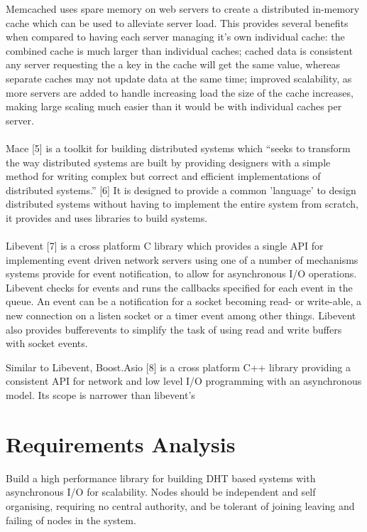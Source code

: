 \documentclass{article}
\begin{document}
Memcached uses spare memory on web servers to create a distributed in-memory cache which can be used to alleviate server load. This provides several benefits when compared to having each server managing it's own individual cache: the combined cache is much larger than individual caches; cached data is consistent any server requesting the a key in the cache will get the same value, whereas separate caches may not update data at the same time; improved scalability, as more servers are added to handle increasing load the size of the cache increases, making large scaling much easier than it would be with individual caches per server.
\\
\\
Mace [5] is a toolkit for building distributed systems which “seeks to transform the way distributed systems are built by providing designers with a simple method for writing complex but correct and efficient implementations of distributed systems.” [6] It is designed to provide a common 'language' to design distributed systems without having to implement the entire system from scratch, it provides and uses libraries to build systems.
\\
\\
Libevent [7] is a cross platform C library which provides a single API for implementing event driven network servers using one of a number of mechanisms systems provide for event notification, to allow for asynchronous I/O operations. Libevent checks for events and runs the callbacks specified for each event in the queue. An event can be a notification for a socket becoming read- or write-able, a new connection on a listen socket or a timer event among other things. Libevent also provides bufferevents to simplify the task of using read and write buffers with socket events.

Similar to Libevent, Boost.Asio [8] is a cross platform C++ library providing a consistent API for network and low level I/O programming with an asynchronous model. Its scope is narrower than libevent's 
\section{Requirements Analysis}
Build a high performance library for building DHT based systems with asynchronous I/O for scalability. Nodes should be independent and self organising, requiring no central authority, and be tolerant of joining leaving and failing of nodes in the system.
\end{document}
